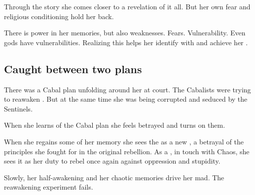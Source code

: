 Through the story she comes closer to a revelation of it all. 
But her own fear and religious conditioning hold her back. 


There is power in her memories, but also weaknesses. 
Fears. 
Vulnerability. 
Even gods have vulnerabilities. 
Realizing this helps her identify with \Shiaraid{} and achieve her \apotheosis. 










\subsection{Caught between two plans}
There was a Cabal plan unfolding around her at court. 
The Cabalists were trying to reawaken \Shiaraid. 
But at the same time she was being corrupted and seduced by the Sentinels. 

When she learns of the Cabal plan she feels betrayed and turns on them. 

When she regains some of her memory she sees the \VaimonCaliphate as a new \Merkyrah, a betrayal of the principles she fought for in the original rebellion. 
As a \Mystraacht, in touch with Chaos, she sees it as her duty to rebel once again against oppression and stupidity. 

Slowly, her half-awakening and her chaotic memories drive her mad. 
The \Malach{} reawakening experiment fails. 





